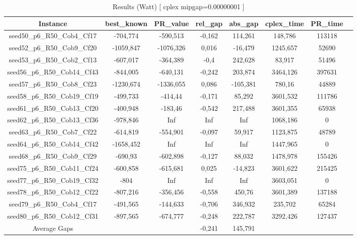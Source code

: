 \documentclass[a4paper]{article}
\begin{document}
\begin{center}
\begin{longtable}{cccccccc}
\caption{Results (Watt)  [ cplex mipgap=0.00000001 ]}
\tabularnewline
\hline
Instance & best\_known & PR\_value & rel\_gap & abs\_gap & cplex\_time & PR\_time\\
\hline
seed50\_p6\_R50\_Cob4\_Cf17 & -704,774 & -590,513 & -0,162 & 114,261 & 148,786 & 113118\\
\hline
seed52\_p6\_R50\_Cob9\_Cf20 & -1059,847 & -1076,326 & 0,016 & -16,479 & 1245,657 & 52690\\
\hline
seed53\_p6\_R50\_Cob2\_Cf13 & -607,017 & -364,389 & -0,4 & 242,628 & 83,917 & 51496\\
\hline
seed56\_p6\_R50\_Cob14\_Cf43 & -844,005 & -640,131 & -0,242 & 203,874 & 3464,126 & 397631\\
\hline
seed57\_p6\_R50\_Cob8\_Cf23 & -1230,674 & -1336,055 & 0,086 & -105,381 & 780,16 & 44889\\
\hline
seed58\_p6\_R50\_Cob19\_Cf19 & -499,733 & -414,44 & -0,171 & 85,292 & 3601,532 & 111786\\
\hline
seed61\_p6\_R50\_Cob13\_Cf20 & -400,948 & -183,46 & -0,542 & 217,488 & 3601,355 & 65938\\
\hline
seed62\_p6\_R50\_Cob13\_Cf36 & -978,846 & Inf & Inf & Inf & 1068,186 & 0\\
\hline
seed63\_p6\_R50\_Cob7\_Cf22 & -614,819 & -554,901 & -0,097 & 59,917 & 1123,875 & 48789\\
\hline
seed64\_p6\_R50\_Cob14\_Cf42 & -1658,452 & Inf & Inf & Inf & 1447,965 & 0\\
\hline
seed68\_p6\_R50\_Cob9\_Cf29 & -690,93 & -602,898 & -0,127 & 88,032 & 1478,978 & 155426\\
\hline
seed75\_p6\_R50\_Cob11\_Cf24 & -600,858 & -615,681 & 0,025 & -14,823 & 3601,622 & 215425\\
\hline
seed77\_p6\_R50\_Cob19\_Cf32 & -804 & Inf & Inf & Inf & 3603,051 & 0\\
\hline
seed78\_p6\_R50\_Cob12\_Cf22 & -807,216 & -356,456 & -0,558 & 450,76 & 3601,389 & 137188\\
\hline
seed79\_p6\_R50\_Cob4\_Cf17 & -491,565 & -144,633 & -0,706 & 346,932 & 235,702 & 65284\\
\hline
seed80\_p6\_R50\_Cob12\_Cf31 & -897,565 & -674,777 & -0,248 & 222,787 & 3292,426 & 127437\\
\hline
\hline
Average Gaps & & & -0,241 & 145,791 & & \\
\hline
\hline
\end{longtable}
\end{center}
\end{document}

